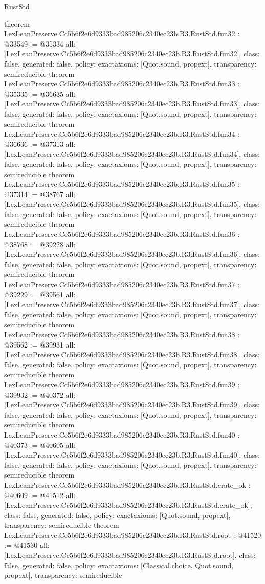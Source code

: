 \begin{lexlean}{RustStd}
\begin{coremodule}
{}
theorem LexLeanPreserve.Cc5b6f2e6d9333bad985206c2340ec23b.R3.RustStd.fun32 : @33549 := @35334 {
  all: [LexLeanPreserve.Cc5b6f2e6d9333bad985206c2340ec23b.R3.RustStd.fun32],
  class: false,
  generated: false,
  policy: exact{axioms: [Quot.sound, propext]},
  transparency: semireducible
}
theorem LexLeanPreserve.Cc5b6f2e6d9333bad985206c2340ec23b.R3.RustStd.fun33 : @35335 := @36635 {
  all: [LexLeanPreserve.Cc5b6f2e6d9333bad985206c2340ec23b.R3.RustStd.fun33],
  class: false,
  generated: false,
  policy: exact{axioms: [Quot.sound, propext]},
  transparency: semireducible
}
theorem LexLeanPreserve.Cc5b6f2e6d9333bad985206c2340ec23b.R3.RustStd.fun34 : @36636 := @37313 {
  all: [LexLeanPreserve.Cc5b6f2e6d9333bad985206c2340ec23b.R3.RustStd.fun34],
  class: false,
  generated: false,
  policy: exact{axioms: [Quot.sound, propext]},
  transparency: semireducible
}
theorem LexLeanPreserve.Cc5b6f2e6d9333bad985206c2340ec23b.R3.RustStd.fun35 : @37314 := @38767 {
  all: [LexLeanPreserve.Cc5b6f2e6d9333bad985206c2340ec23b.R3.RustStd.fun35],
  class: false,
  generated: false,
  policy: exact{axioms: [Quot.sound, propext]},
  transparency: semireducible
}
theorem LexLeanPreserve.Cc5b6f2e6d9333bad985206c2340ec23b.R3.RustStd.fun36 : @38768 := @39228 {
  all: [LexLeanPreserve.Cc5b6f2e6d9333bad985206c2340ec23b.R3.RustStd.fun36],
  class: false,
  generated: false,
  policy: exact{axioms: [Quot.sound, propext]},
  transparency: semireducible
}
theorem LexLeanPreserve.Cc5b6f2e6d9333bad985206c2340ec23b.R3.RustStd.fun37 : @39229 := @39561 {
  all: [LexLeanPreserve.Cc5b6f2e6d9333bad985206c2340ec23b.R3.RustStd.fun37],
  class: false,
  generated: false,
  policy: exact{axioms: [Quot.sound, propext]},
  transparency: semireducible
}
theorem LexLeanPreserve.Cc5b6f2e6d9333bad985206c2340ec23b.R3.RustStd.fun38 : @39562 := @39931 {
  all: [LexLeanPreserve.Cc5b6f2e6d9333bad985206c2340ec23b.R3.RustStd.fun38],
  class: false,
  generated: false,
  policy: exact{axioms: [Quot.sound, propext]},
  transparency: semireducible
}
theorem LexLeanPreserve.Cc5b6f2e6d9333bad985206c2340ec23b.R3.RustStd.fun39 : @39932 := @40372 {
  all: [LexLeanPreserve.Cc5b6f2e6d9333bad985206c2340ec23b.R3.RustStd.fun39],
  class: false,
  generated: false,
  policy: exact{axioms: [Quot.sound, propext]},
  transparency: semireducible
}
theorem LexLeanPreserve.Cc5b6f2e6d9333bad985206c2340ec23b.R3.RustStd.fun40 : @40373 := @40605 {
  all: [LexLeanPreserve.Cc5b6f2e6d9333bad985206c2340ec23b.R3.RustStd.fun40],
  class: false,
  generated: false,
  policy: exact{axioms: [Quot.sound, propext]},
  transparency: semireducible
}
theorem LexLeanPreserve.Cc5b6f2e6d9333bad985206c2340ec23b.R3.RustStd.crate_ok : @40609 := @41512 {
  all: [LexLeanPreserve.Cc5b6f2e6d9333bad985206c2340ec23b.R3.RustStd.crate_ok],
  class: false,
  generated: false,
  policy: exact{axioms: [Quot.sound, propext]},
  transparency: semireducible
}
theorem LexLeanPreserve.Cc5b6f2e6d9333bad985206c2340ec23b.R3.RustStd.root : @41520 := @41530 {
  all: [LexLeanPreserve.Cc5b6f2e6d9333bad985206c2340ec23b.R3.RustStd.root],
  class: false,
  generated: false,
  policy: exact{axioms: [Classical.choice, Quot.sound, propext]},
  transparency: semireducible
}


\end{coremodule}
\end{lexlean}
